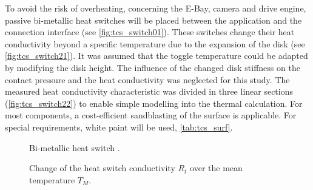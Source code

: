 To avoid the risk of overheating, concerning the E-Bay, camera and drive engine, passive bi-metallic heat switches  will be  placed between the application and the connection interface (see \autoref{fig:tcs_switch01}).
These switches change their heat conductivity beyond a specific temperature due to the expansion of the disk (see \autoref{fig:tcs_switch21}).
It was assumed that the toggle temperature could be adapted by modifying the disk height.
The influence of the changed disk stiffness on the contact pressure and the heat conductivity was neglected for this study.
The measured heat conductivity characteristic was divided in three linear sections (\autoref{fig:tcs_switch22}) to enable  simple modelling into the thermal calculation.
For most components, a cost-efficient sandblasting of the surface is applicable.
For special requirements, white paint will be used, \autoref{tab:tcs_surf}.

\begin{figure}[H]
	\centering
	\qquad\qquad
	\caption{Bi-metallic heat switch \cite{ref_tcs_04}.}
	\label{fig:tcs_switch01}
\end{figure}

\begin{figure}[H]
	\centering
	\qquad
	\caption{Change of the heat switch conductivity $R_t$ over the mean temperature $T_M$.}
	\label{fig:tcs_switch02}
\end{figure}

